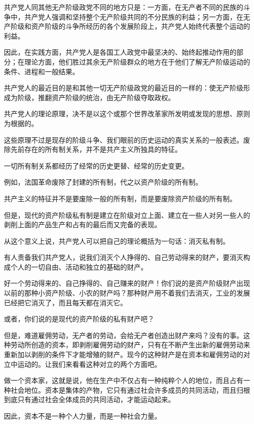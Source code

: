     共产党人同其他无产阶级政党不同的地方只是：一方面，在无产者不同的民族的斗争中，共产党人强调和坚持整个无产阶级共同的不分民族的利益；另一方面，在无产阶级和资产阶级的斗争所经历的各个发展阶段上，共产党人始终代表整个运动的利益。

    因此，在实践方面，共产党人是各国工人政党中最坚决的、始终起推动作用的部分；在理论方面，他们胜过其余无产阶级群众的地方在于他们了解无产阶级运动的条件、进程和一般结果。

    共产党人的最近目的是和其他一切无产阶级政党的最近目的一样的：使无产阶级形成为阶级，推翻资产阶级的统治，由无产阶级夺取政权。

    共产党人的理论原理，决不是以这个或那个世界改革家所发明或发现的思想、原则为根据的。

    这些原理不过是现存的阶级斗争、我们眼前的历史运动的真实关系的一般表述。废除先前存在的所有制关系，并不是共产主义所独具的特征。

    一切所有制关系都经历了经常的历史更替、经常的历史变更。

    例如，法国革命废除了封建的所有制，代之以资产阶级的所有制。

    共产主义的特征并不是要废除一般的所有制，而是要废除资产阶级的所有制。

    但是，现代的资产阶级私有制是建立在阶级对立上面、建立在一些人对另一些人的剥削上面的产品生产和占有的最后而又完备的表现。

    从这个意义上说，共产党人可以把自己的理论概括为一句话：消灭私有制。

    有人责备我们共产党人，说我们消灭个人挣得的、自己劳动得来的财产，要消灭构成个人的一切自由、活动和独立的基础的财产。

    好一个劳动得来的、自己挣得的、自己赚来的财产！你们说的是资产阶级财产出现以前的那种小资产阶级、小农的财产吗？那种财产用不着我们去消灭，工业的发展已经把它消灭了，而且每天都在消灭它。

    或者，你们说的是现代的资产阶级的私有财产吧？

    但是，难道雇佣劳动，无产者的劳动，会给无产者创造出财产来吗？没有的事。这种劳动所创造的资本，即剥削雇佣劳动的财产，只有在不断产生出新的雇佣劳动来重新加以剥削的条件下才能增殖的财产。现今的这种财产是在资本和雇佣劳动的对立中运动的。让我们来看看这种对立的两个方面吧。

    做一个资本家，这就是说，他在生产中不仅占有一种纯粹个人的地位，而且占有一种社会地位。资本是集体的产物，它只有通过社会许多成员的共同活动，而且归根到底只有通过社会全体成员的共同活动，才能运动起来。

    因此，资本不是一种个人力量，而是一种社会力量。

